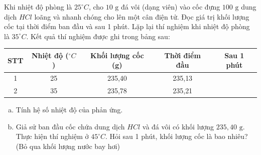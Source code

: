 \begin{bt}
	Khi nhiệt độ phòng là $25^\circ C$, cho $10 \text{ g}$ đá vôi (dạng viên) vào cốc đựng $100 \text{ g}$ dung dịch $HCl$ loãng và nhanh chóng cho lên một cân điện tử. Đọc giá trị khối lượng cốc tại thời điểm ban đầu và sau 1 phút.
	Lặp lại thí nghiệm khi nhiệt độ phòng là $35^\circ C$. Kết quả thí nghiệm được ghi trong bảng sau:
	\begin{center}
		\begin{tabular}{|c|c|c|c|c|}
			\hline
			STT & Nhiệt độ ($^\circ C$) & Khối lượng cốc (g) & Thời điểm đầu & Sau 1 phút \\
			\hline
			1 & 25 & 235{,}40 & 235{,}13 \\
			\hline
			2 & 35 & 235{,}78 & 235{,}21 \\
			\hline
		\end{tabular}
	\end{center}
	\begin{enumerate}[a)]
		\item Tính hệ số nhiệt độ của phản ứng.
		\item Giả sử ban đầu cốc chứa dung dịch $HCl$ và đá vôi có khối lượng $235{,}40 \text{ g}$. Thực hiện thí nghiệm ở $45^\circ C$. Hỏi sau 1 phút, khối lượng cốc là bao nhiêu? (Bỏ qua khối lượng nước bay hơi)
	\end{enumerate}
\end{bt}

